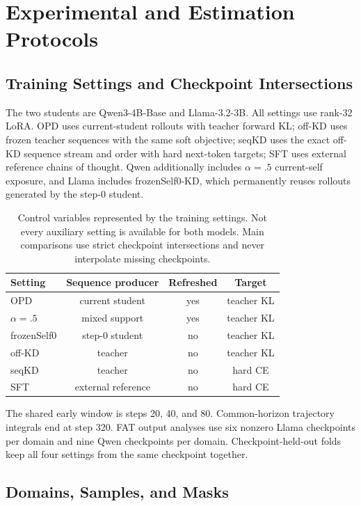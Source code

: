 \documentclass[letterpaper]{article} %
\begin{document}
\section{Experimental and Estimation Protocols}

\subsection{Training Settings and Checkpoint Intersections}

The two students are Qwen3-4B-Base and Llama-3.2-3B. All settings use rank-32 LoRA.
OPD uses current-student rollouts with teacher forward KL; off-KD uses frozen teacher
sequences with the same soft objective; seqKD uses the exact off-KD sequence stream and
order with hard next-token targets; SFT uses external reference chains of thought.
Qwen additionally includes $\alpha=.5$ current-self exposure, and Llama includes
frozenSelf0-KD, which permanently reuses rollouts generated by the step-0 student.

\begin{table}[t]
\centering
\small
\setlength{\tabcolsep}{3.5pt}
\begin{tabular}{lccc}
\toprule
Setting & Sequence producer & Refreshed & Target \\
\midrule
OPD & current student & yes & teacher KL \\
$\alpha=.5$ & mixed support & yes & teacher KL \\
frozenSelf0 & step-0 student & no & teacher KL \\
off-KD & teacher & no & teacher KL \\
seqKD & teacher & no & hard CE \\
SFT & external reference & no & hard CE \\
\bottomrule
\end{tabular}
\caption{Control variables represented by the training settings. Not every auxiliary setting is
available for both models. Main comparisons use strict checkpoint intersections and never
interpolate missing checkpoints.}
\label{tab:supp-settings}
\end{table}

The shared early window is steps 20, 40, and 80. Common-horizon trajectory integrals end
at step 320. FAT output analyses use six nonzero Llama checkpoints per domain and nine
Qwen checkpoints per domain. Checkpoint-held-out folds keep all four settings from the same
checkpoint together.

\subsection{Domains, Samples, and Masks}
\end{document}
